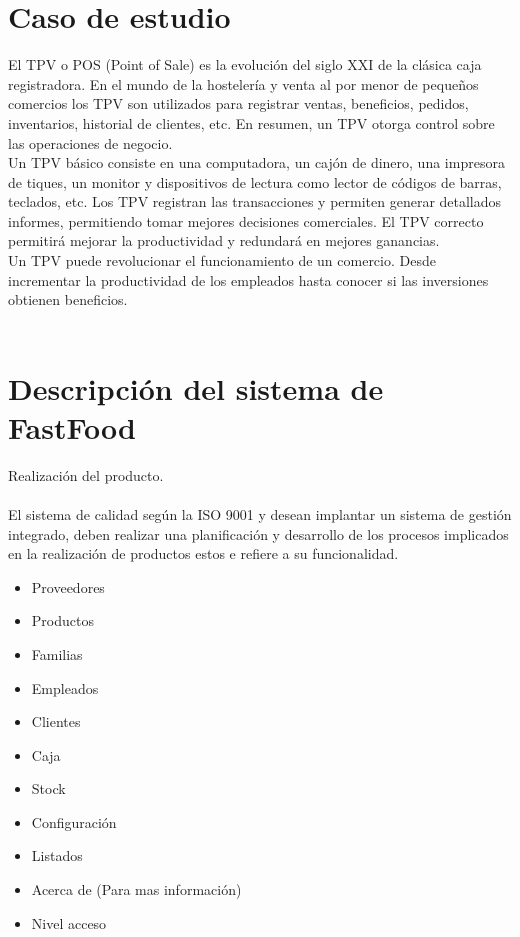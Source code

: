 \documentclass[12pt,a4paper]{article}
\begin{document}
\section{Caso de estudio}
El TPV o POS (Point of Sale) es la evolución del siglo XXI de la clásica caja registradora. En el mundo de la hostelería y venta al por menor de pequeños comercios los TPV son utilizados para registrar ventas, beneficios, pedidos, inventarios, historial de clientes, etc. En resumen, un TPV otorga control sobre las operaciones de negocio.\\
Un TPV básico consiste en una computadora, un cajón de dinero, una impresora de tiques, un monitor y dispositivos de lectura como lector de códigos de barras, teclados, etc. Los TPV registran las transacciones y permiten generar detallados informes, permitiendo tomar mejores decisiones comerciales. El TPV correcto permitirá mejorar la productividad y redundará en mejores ganancias.\\
Un TPV puede revolucionar el funcionamiento de un comercio. Desde incrementar la productividad de los empleados hasta conocer si las inversiones obtienen beneficios.\\\\


\section{Descripción del sistema de FastFood}
Realización del producto.\\\\
El sistema de calidad según la ISO 9001 y desean implantar un sistema de gestión integrado, deben realizar una planificación y desarrollo de los procesos implicados en la realización de productos estos e refiere a su funcionalidad.
\begin{itemize}
\item Proveedores
\item Productos
\item Familias
\item Empleados
\item Clientes
\item Caja
\item Stock
\item Configuración
\item Listados
\item Acerca de (Para mas información)
\item Nivel acceso\\\\
\end{itemize}
\end{document}
